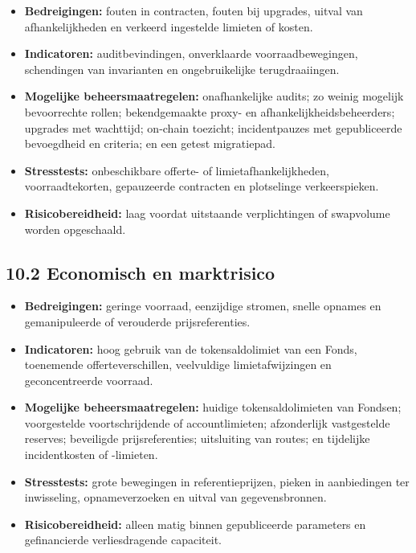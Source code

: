 \documentclass[11pt]{article}
\begin{document}
\begin{itemize}[leftmargin=*]
\item \textbf{Bedreigingen:} fouten in contracten, fouten bij upgrades, uitval van afhankelijkheden en verkeerd ingestelde limieten of kosten.
\item \textbf{Indicatoren:} auditbevindingen, onverklaarde voorraadbewegingen, schendingen van invarianten en ongebruikelijke terugdraaiingen.
\item \textbf{Mogelijke beheersmaatregelen:} onafhankelijke audits; zo weinig mogelijk bevoorrechte rollen; bekendgemaakte proxy- en afhankelijkheidsbeheerders; upgrades met wachttijd; on-chain toezicht; incidentpauzes met gepubliceerde bevoegdheid en criteria; en een getest migratiepad.
\item \textbf{Stresstests:} onbeschikbare offerte- of limietafhankelijkheden, voorraadtekorten, gepauzeerde contracten en plotselinge verkeerspieken.
\item \textbf{Risicobereidheid:} laag voordat uitstaande verplichtingen of swapvolume worden opgeschaald.
\end{itemize}
\subsection*{10.2 Economisch en marktrisico}

\begin{itemize}[leftmargin=*]
\item \textbf{Bedreigingen:} geringe voorraad, eenzijdige stromen, snelle opnames en gemanipuleerde of verouderde prijsreferenties.
\item \textbf{Indicatoren:} hoog gebruik van de tokensaldolimiet van een Fonds, toenemende offerteverschillen, veelvuldige limietafwijzingen en geconcentreerde voorraad.
\item \textbf{Mogelijke beheersmaatregelen:} huidige tokensaldolimieten van Fondsen; voorgestelde voortschrijdende of accountlimieten; afzonderlijk vastgestelde reserves; beveiligde prijsreferenties; uitsluiting van routes; en tijdelijke incidentkosten of -limieten.
\item \textbf{Stresstests:} grote bewegingen in referentieprijzen, pieken in aanbiedingen ter inwisseling, opnameverzoeken en uitval van gegevensbronnen.
\item \textbf{Risicobereidheid:} alleen matig binnen gepubliceerde parameters en gefinancierde verliesdragende capaciteit.
\end{itemize}
\end{document}
